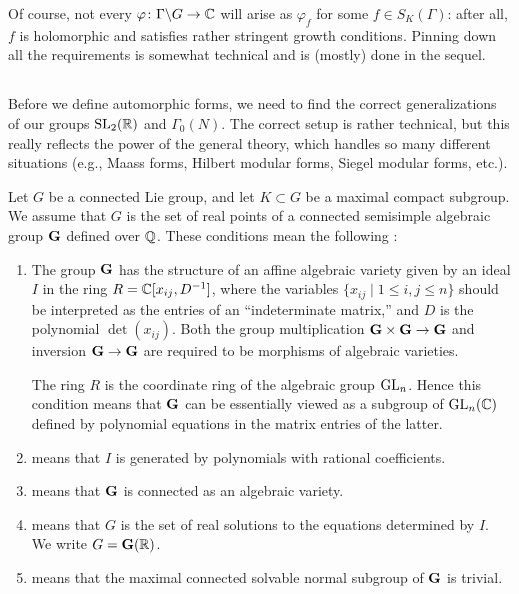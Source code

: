 Of course, not every $\varphi \colon \Gamma \backslash G \rightarrow
\mathbb{C}$ will arise as $\varphi_{f}$ for some $f\in S_{K} (\Gamma)$: after
all, $f$ is holomorphic and satisfies rather stringent growth
conditions.  Pinning down all the requirements is somewhat technical
and is (mostly) done in the sequel.

\subsection{}\label{ss:a.gps}
%
Before we define automorphic forms, we need to find the correct
generalizations of our groups $\operatorname{SL}_{2} (\mathbb{R})$ and $\Gamma_{0} (N)$.
The correct setup is rather technical, but this really reflects the
power of the general theory, which handles so many different
situations (e.g., Maass forms, Hilbert modular forms, Siegel
modular forms, etc.).

Let $G$ be a connected Lie group, and let $K\subset G$ be a maximal
compact subgroup.  We assume that $G$ is the set of real points of a
connected semisimple algebraic group $\mathbf{G} $ defined over $\mathbb{Q}$.  These
conditions mean the following \cite[\S2.1.1]{plat.rapin}:
\begin{enumerate}
\item The group $\mathbf{G}$ has the structure of an affine algebraic variety given by an ideal
$I$ in the ring $R = \mathbb{C} [x_{ij}, D^{-1} ]$, where the variables $\{
x_{ij} \mid 1\leq i,j\leq n\}$ should be interpreted as the entries of
an ``indeterminate matrix,'' and $D$ is the polynomial $\det
(x_{ij})$.  Both the group multiplication $\mathbf{G} \times \mathbf{G} \rightarrow \mathbf{G}$
 and inversion $\mathbf{G} \rightarrow \mathbf{G}$ are required to be morphisms of
algebraic varieties.

The ring $R$ is the coordinate ring of the algebraic group $\operatorname{GL}_{n}$.
Hence this condition means that $\mathbf{G}$ can be essentially viewed as a
subgroup of $\operatorname{GL}_{n} (\mathbb{C})$ defined by polynomial equations in the
matrix entries of the latter.
\item {} means that $I$ is generated by
polynomials with rational coefficients.
\item {} means that $\mathbf{G} $ is connected as an algebraic variety.
\item {} means that $G$ is the set of real
solutions to the equations determined by $I$. We write $G = \mathbf{G} (\mathbb{R})$.
\item {} means that the maximal connected 
solvable normal subgroup of $\mathbf{G}$ is trivial.
\end{enumerate}

